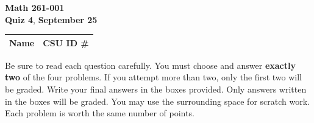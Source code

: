 \documentclass[12pt]{exam}
\newcommand{\class}{Math 261-001}
\newcommand{\examnum}{Quiz 4}
\newcommand{\examdate}{September 25}
\begin{document}
\pagestyle{plain}
\thispagestyle{empty}

\noindent
\textbf{\class}\\
\textbf{\examnum}, \textbf{\examdate} \\

\setlength{\tabcolsep}{3.5cm}
\renewcommand{\arraystretch}{1.5}
\setlength\extrarowheight{1cm}
\begin{tabular}{ |c|c| }
 \hline
 Name   & CSU ID \#  \\
 \hline
\end{tabular}

\vspace{10pt}

Be sure to read each question carefully. You must choose and answer
\textbf{exactly two} of the four problems. If you attempt more than two, only
the first two will be graded. Write your final answers in the boxes provided.
Only answers written in the boxes will be graded. You may use the surrounding
space for scratch work. Each problem is worth the same number of points.
\end{document}
